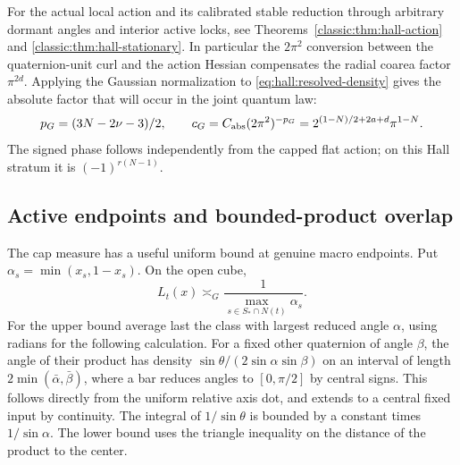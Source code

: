 For the actual local action and its calibrated stable reduction
through arbitrary dormant angles and interior active locks, see
Theorems~\ref{classic:thm:hall-action} and
\ref{classic:thm:hall-stationary}. In particular the \(2\pi^2\)
conversion between the quaternion-unit curl and the action Hessian
compensates the radial coarea factor \(\pi^{2d}\). Applying the
Gaussian normalization to \eqref{eq:hall:resolved-density} gives the
absolute factor that will occur in the joint quantum law:
\begin{equation}
 p_G=(3N-2\nu-3)/2,\qquad
 c_G=C_{\rm abs}(2\pi^2)^{-p_G}
    =2^{(1-N)/2+2a+d}\pi^{1-N}.
 \label{eq:hall:normalization}
\end{equation}
The signed phase follows independently from the capped flat action;
on this Hall stratum it is \((-1)^{r(N-1)}\).

\subsection{Active endpoints and bounded-product overlap}
\label{sec:hall:overlap}

The cap measure has a useful uniform bound at genuine macro
endpoints. Put \(\alpha_s=\min(x_s,1-x_s)\). On the open cube,
\[
       L_t(x)\asymp_G
        \frac{1}{\max_{s\in S_*\cap N(t)}\alpha_s}.
\]
For the upper bound average last the class with largest reduced
angle \(\alpha\), using radians for the following calculation. For a
fixed other quaternion of angle \(\beta\), the angle of their product
has density \(\sin\theta/(2\sin\alpha\sin\beta)\) on an interval of
length \(2\min(\bar\alpha,\bar\beta)\), where a bar reduces angles to
\([0,\pi/2]\) by central signs. This follows directly from the uniform
relative axis dot, and extends to a central fixed input by
continuity. The integral of \(1/\sin\theta\) is bounded by a constant
times \(1/\sin\alpha\). The lower bound uses the triangle inequality
on the distance of the product to the center.

